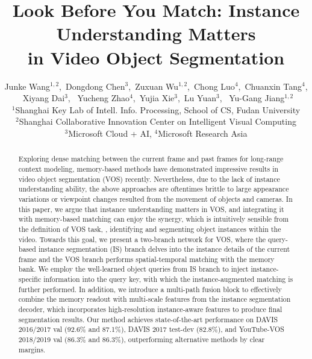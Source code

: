 \documentclass[10pt,twocolumn,letterpaper]{article}
\begin{document}
\title{Look Before You Match: Instance Understanding Matters \\ in Video Object Segmentation}

\author{Junke Wang$^{1,2}$,~Dongdong Chen$^{3}$,~Zuxuan Wu$^{1,2}$,~Chong Luo$^{4}$,~Chuanxin Tang$^{4}$, \\ ~Xiyang Dai$^{3}$, ~Yucheng Zhao$^{4}$,~Yujia Xie$^{3}$,~Lu Yuan$^{3}$, ~Yu-Gang Jiang$^{1,2}$
\\
$^{1}$Shanghai Key Lab of Intell. Info. Processing, School of CS, Fudan University \\
$^{2}$Shanghai Collaborative Innovation Center on Intelligent Visual Computing \\
$^{3}$Microsoft Cloud + AI, $^{4}$Microsoft Research Asia 
}

\maketitle


\begin{abstract}
Exploring dense matching between the current frame and past frames for long-range context modeling, memory-based methods have demonstrated impressive results in video object segmentation (VOS) recently. Nevertheless, due to the lack of instance understanding ability, the above approaches are oftentimes brittle to large appearance variations or viewpoint changes resulted from the movement of objects and cameras. In this paper, we argue that instance understanding matters in VOS, and integrating it with memory-based matching can enjoy the synergy, which is intuitively sensible from the definition of VOS task, \ie, identifying and segmenting object instances within the video. Towards this goal, we present a two-branch network for VOS, where the query-based instance segmentation (IS) branch delves into the instance details of the current frame and the VOS branch performs spatial-temporal matching with the memory bank. We employ the well-learned object queries from IS branch to inject instance-specific information into the query key, with which the instance-augmented matching is further performed. In addition, we introduce a multi-path fusion block to effectively combine the memory readout with multi-scale features from the instance segmentation decoder, which incorporates high-resolution instance-aware features to produce final segmentation results. Our method achieves state-of-the-art performance on DAVIS 2016/2017 val (92.6\% and 87.1\%), DAVIS 2017 test-dev (82.8\%), and YouTube-VOS 2018/2019 val (86.3\% and
86.3\%), outperforming alternative methods by clear margins. 
\end{abstract}
\end{document}
